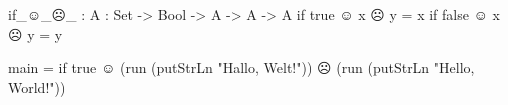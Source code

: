 
\begin{code}
if_☺_☹_ : {A : Set} -> Bool -> A -> A -> A
if true ☺ x ☹ y = x
if false ☺ x ☹ y = y

main = if true
  ☺ (run (putStrLn "Hallo, Welt!"))
  ☹ (run (putStrLn "Hello, World!"))
\end{code}
